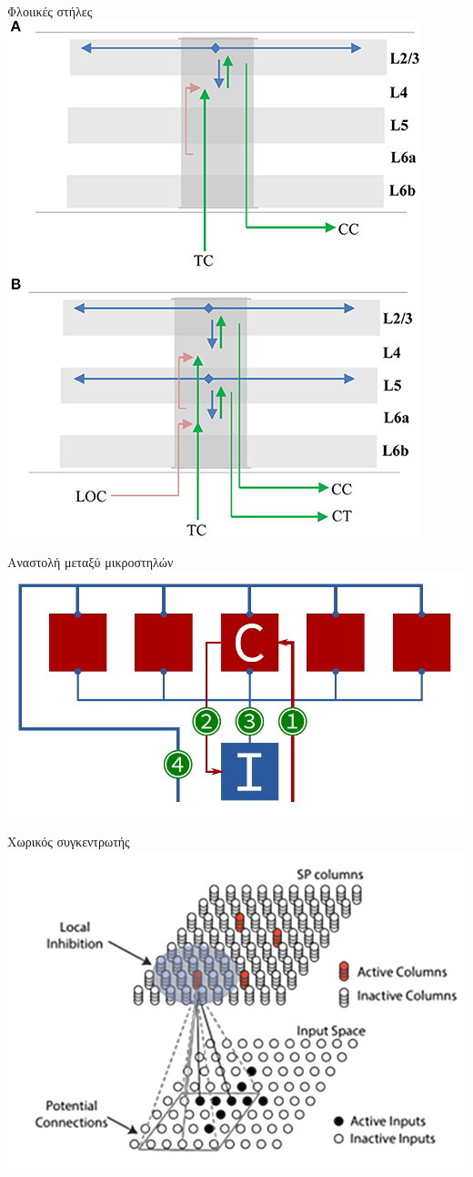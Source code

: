 \documentclass[10pt,lualatex]{beamer}
\begin{document}
\begin{frame}{Φλοιικές στήλες}
  \centering
  \includegraphics[width=.6\textwidth]{../figures/layers_in_column}
\end{frame}

\begin{frame}{Αναστολή μεταξύ μικροστηλών}
  \centering
  \includegraphics[width=\textwidth]{../figures/spatial_hardware}
\end{frame}

\begin{frame}{Χωρικός συγκεντρωτής}
  \centering
  \includegraphics[width=.9\textwidth]{../figures/vlsi-present/spatpool}
\end{frame}
\end{document}
